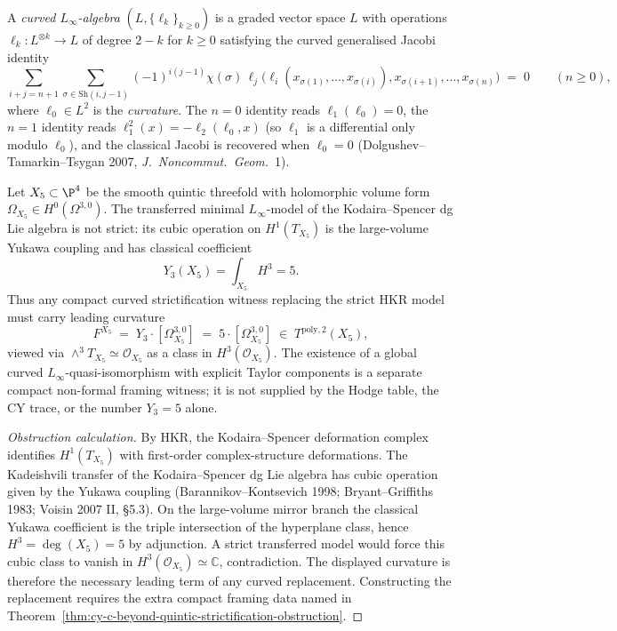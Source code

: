 \begin{definition}
\label{def:curved-linfty}
A \emph{curved $L_\infty$-algebra} $(L, \{\ell_k\}_{k \geq 0})$ is a graded vector space $L$ with operations $\ell_k \colon L^{\otimes k} \to L$ of degree $2-k$ for $k \geq 0$ satisfying the curved generalised Jacobi identity
\[
 \sum_{i+j = n+1} \sum_{\sigma \in \mathrm{Sh}(i, j-1)} (-1)^{i(j-1)} \chi(\sigma)\,
 \ell_j\bigl(\ell_i(x_{\sigma(1)}, \ldots, x_{\sigma(i)}), x_{\sigma(i+1)}, \ldots, x_{\sigma(n)}\bigr)
 \;=\; 0
 \qquad (n \geq 0),
\]
where $\ell_0 \in L^2$ is the \emph{curvature}. The $n = 0$ identity reads $\ell_1(\ell_0) = 0$, the $n = 1$ identity reads $\ell_1^2(x) = -\ell_2(\ell_0, x)$ (so $\ell_1$ is a differential only modulo $\ell_0$), and the classical Jacobi is recovered when $\ell_0 = 0$ (Dolgushev--Tamarkin--Tsygan 2007, \textit{J.~Noncommut.~Geom.}~1).
\end{definition}

\begin{theorem}
\label{thm:curved-kontsevich-quintic}
Let $X_5 \subset \P^4$ be the smooth quintic threefold with holomorphic volume form
$\Omega_{X_5} \in H^0(\Omega^{3,0})$. The transferred minimal
$L_\infty$-model of the Kodaira--Spencer dg Lie algebra is not strict:
its cubic operation on $H^1(T_{X_5})$ is the large-volume Yukawa
coupling and has classical coefficient
\[
 Y_3(X_5)=\int_{X_5}H^3=5.
\]
Thus any compact curved strictification witness replacing the strict
HKR model must carry leading curvature
\[
 F^{X_5} \;=\; Y_3 \cdot [\Omega_{X_5}^{3,0}] \;=\; 5 \cdot [\Omega_{X_5}^{3,0}]
 \;\in\; T^{\mathrm{poly},2}(X_5),
\]
viewed via $\wedge^3T_{X_5}\simeq\mathcal O_{X_5}$ as a class in
$H^3(\mathcal O_{X_5})$. The existence of a global curved
$L_\infty$-quasi-isomorphism with explicit Taylor components is a
separate compact non-formal framing witness; it is not supplied by the
Hodge table, the CY trace, or the number $Y_3=5$ alone.
\end{theorem}

\begin{proof}[Obstruction calculation]
By HKR, the Kodaira--Spencer deformation complex identifies
$H^1(T_{X_5})$ with first-order complex-structure deformations. The
Kadeishvili transfer of the Kodaira--Spencer dg Lie algebra has cubic
operation given by the Yukawa coupling (Barannikov--Kontsevich 1998;
Bryant--Griffiths 1983; Voisin 2007 II, \S5.3). On the large-volume
mirror branch the classical Yukawa coefficient is the triple
intersection of the hyperplane class, hence $H^3=\deg(X_5)=5$ by
adjunction. A strict transferred model would force this cubic class to
vanish in $H^3(\mathcal O_{X_5})\simeq\mathbb C$, contradiction. The
displayed curvature is therefore the necessary leading term of any
curved replacement. Constructing the replacement requires the extra
compact framing data named in
Theorem~\ref{thm:cy-c-beyond-quintic-strictification-obstruction}.
\end{proof}

